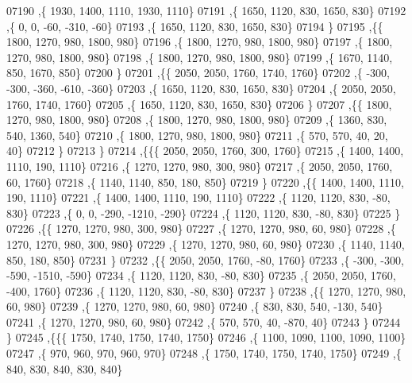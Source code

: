 \begin{DoxyCode}
07190     ,\{  1930,  1400,  1110,  1930,  1110\}
07191     ,\{  1650,  1120,   830,  1650,   830\}
07192     ,\{     0,     0,   -60,  -310,   -60\}
07193     ,\{  1650,  1120,   830,  1650,   830\}
07194     \}
07195    ,\{\{  1800,  1270,   980,  1800,   980\}
07196     ,\{  1800,  1270,   980,  1800,   980\}
07197     ,\{  1800,  1270,   980,  1800,   980\}
07198     ,\{  1800,  1270,   980,  1800,   980\}
07199     ,\{  1670,  1140,   850,  1670,   850\}
07200     \}
07201    ,\{\{  2050,  2050,  1760,  1740,  1760\}
07202     ,\{  -300,  -300,  -360,  -610,  -360\}
07203     ,\{  1650,  1120,   830,  1650,   830\}
07204     ,\{  2050,  2050,  1760,  1740,  1760\}
07205     ,\{  1650,  1120,   830,  1650,   830\}
07206     \}
07207    ,\{\{  1800,  1270,   980,  1800,   980\}
07208     ,\{  1800,  1270,   980,  1800,   980\}
07209     ,\{  1360,   830,   540,  1360,   540\}
07210     ,\{  1800,  1270,   980,  1800,   980\}
07211     ,\{   570,   570,    40,    20,    40\}
07212     \}
07213    \}
07214   ,\{\{\{  2050,  2050,  1760,   300,  1760\}
07215     ,\{  1400,  1400,  1110,   190,  1110\}
07216     ,\{  1270,  1270,   980,   300,   980\}
07217     ,\{  2050,  2050,  1760,    60,  1760\}
07218     ,\{  1140,  1140,   850,   180,   850\}
07219     \}
07220    ,\{\{  1400,  1400,  1110,   190,  1110\}
07221     ,\{  1400,  1400,  1110,   190,  1110\}
07222     ,\{  1120,  1120,   830,   -80,   830\}
07223     ,\{     0,     0,  -290, -1210,  -290\}
07224     ,\{  1120,  1120,   830,   -80,   830\}
07225     \}
07226    ,\{\{  1270,  1270,   980,   300,   980\}
07227     ,\{  1270,  1270,   980,    60,   980\}
07228     ,\{  1270,  1270,   980,   300,   980\}
07229     ,\{  1270,  1270,   980,    60,   980\}
07230     ,\{  1140,  1140,   850,   180,   850\}
07231     \}
07232    ,\{\{  2050,  2050,  1760,   -80,  1760\}
07233     ,\{  -300,  -300,  -590, -1510,  -590\}
07234     ,\{  1120,  1120,   830,   -80,   830\}
07235     ,\{  2050,  2050,  1760,  -400,  1760\}
07236     ,\{  1120,  1120,   830,   -80,   830\}
07237     \}
07238    ,\{\{  1270,  1270,   980,    60,   980\}
07239     ,\{  1270,  1270,   980,    60,   980\}
07240     ,\{   830,   830,   540,  -130,   540\}
07241     ,\{  1270,  1270,   980,    60,   980\}
07242     ,\{   570,   570,    40,  -870,    40\}
07243     \}
07244    \}
07245   ,\{\{\{  1750,  1740,  1750,  1740,  1750\}
07246     ,\{  1100,  1090,  1100,  1090,  1100\}
07247     ,\{   970,   960,   970,   960,   970\}
07248     ,\{  1750,  1740,  1750,  1740,  1750\}
07249     ,\{   840,   830,   840,   830,   840\}

\end{DoxyCode}
